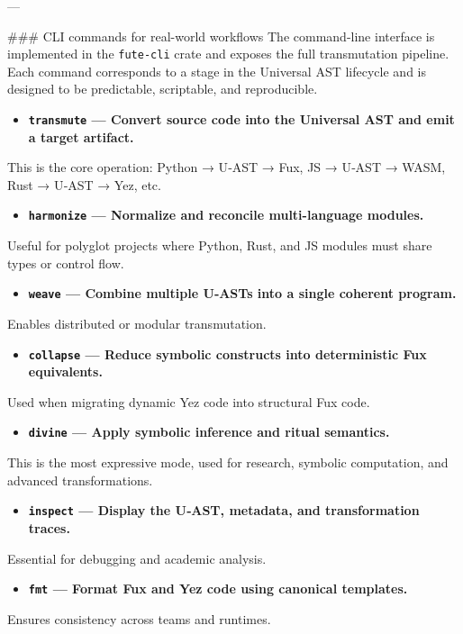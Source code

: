 \documentclass[12pt, a4paper]{book}
\begin{document}
---

\#\#\# CLI commands for real-world workflows  
The command-line interface is implemented in the \texttt{fute-cli} crate and exposes the full transmutation pipeline. Each command corresponds to a stage in the Universal AST lifecycle and is designed to be predictable, scriptable, and reproducible.

\begin{itemize}
  \item \textbf{\texttt{transmute} — Convert source code into the Universal AST and emit a target artifact.}  
\end{itemize}
  This is the core operation: Python → U‑AST → Fux, JS → U‑AST → WASM, Rust → U‑AST → Yez, etc.

\begin{itemize}
  \item \textbf{\texttt{harmonize} — Normalize and reconcile multi-language modules.}  
\end{itemize}
  Useful for polyglot projects where Python, Rust, and JS modules must share types or control flow.

\begin{itemize}
  \item \textbf{\texttt{weave} — Combine multiple U‑ASTs into a single coherent program.}  
\end{itemize}
  Enables distributed or modular transmutation.

\begin{itemize}
  \item \textbf{\texttt{collapse} — Reduce symbolic constructs into deterministic Fux equivalents.}  
\end{itemize}
  Used when migrating dynamic Yez code into structural Fux code.

\begin{itemize}
  \item \textbf{\texttt{divine} — Apply symbolic inference and ritual semantics.}  
\end{itemize}
  This is the most expressive mode, used for research, symbolic computation, and advanced transformations.

\begin{itemize}
  \item \textbf{\texttt{inspect} — Display the U‑AST, metadata, and transformation traces.}  
\end{itemize}
  Essential for debugging and academic analysis.

\begin{itemize}
  \item \textbf{\texttt{fmt} — Format Fux and Yez code using canonical templates.}  
\end{itemize}
  Ensures consistency across teams and runtimes.
\end{document}
